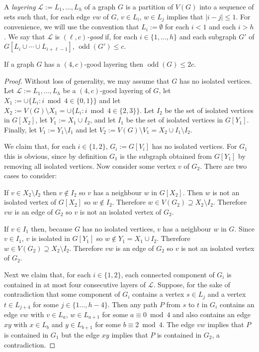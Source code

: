 \documentclass{patmorin}
\DeclareMathOperator{\odd}{odd}
\begin{document}
A \emph{layering} $\mathcal{L}:=L_1,\ldots,L_h$ of a graph $G$ is a partition of $V(G)$ into a sequence of sets such that, for each edge $vw$ of $G$, $v\in L_i$, $w\in L_j$ implies that $|i-j|\le 1$.  For convenience, we will use the convention that $L_i:=\emptyset$ for each $i < 1$ and each $i> h$.  We say that $\mathcal{L}$ is \emph{$(\ell,c)$-good} if, for each $i\in\{1,\ldots,h\}$ and each subgraph $G'$ of $G[L_i\cup\cdots\cup L_{i+\ell-1}]$, $\odd(G')\le c$.


\begin{lem}\label{four_good}
  If a graph $G$ has a $(4,c)$-good layering then $\odd(G)\le 2c$.
\end{lem}

\begin{proof}
  Without loss of generality, we may assume that $G$ has no isolated vertices.
  Let $\mathcal{L}:=L_1,\ldots,L_h$ be a $(4,c)$-good layering of $G$,
  let $X_1:=\cup\{L_i:i\bmod 4\in\{0,1\}\}$ and let $X_2:=V(G)\setminus X_1=\cup\{L_i:i\bmod 4\in\{2,3\}\}$.  Let $I_2$ be the set of isolated vertices in $G[X_2]$, let $Y_1:=X_1\cup I_2$, and let $I_1$ be the set of isolated vertices in $G[Y_1]$.  Finally, let $V_1:=Y_1\setminus I_1$ and let $V_2:=V(G)\setminus V_1=X_2\cup I_1\setminus I_2$.

  We claim that, for each $i\in\{1,2\}$, $G_i:=G[V_i]$ has no isolated vertices. For $G_1$ this is obvious, since by definition $G_1$ is the subgraph obtained from $G[Y_1]$ by removing all isolated vertices.  Now consider some vertex $v$ of $G_2$. There are two cases to consider:
  \begin{compactenum}
    \item If $v\in X_2\setminus I_2$ then $v\not\in I_2$ so $v$ has a neighbour $w$ in $G[X_2]$.  Then $w$ is not an isolated vertex of $G[X_2]$ so $w\not\in I_2$.  Therefore $w\in V(G_2)\supseteq X_2\setminus I_2$. Therefore $vw$ is an edge of $G_2$ so $v$ is not an isolated vertex of $G_2$.
    \item If $v\in I_1$ then, because $G$ has no isolated vertices, $v$ has a neighbour $w$ in $G$.  Since $v\in I_1$, $v$ is isolated in $G[Y_1]$ so $w\not\in Y_1= X_1\cup I_2$. Therefore $w\in V(G_2)\supseteq X_2\setminus I_2$.  Therefore $vw$ is an edge of $G_2$ so $v$ is not an isolated vertex of $G_2$.
  \end{compactenum}
  Next we claim that, for each $i\in\{1,2\}$, each connected component of $G_i$ is contained in at most four consecutive layers of $\mathcal{L}$.  Suppose, for the sake of contradiction that some component of $G_i$ contains a vertex $s\in L_j$ and a vertex $t\in L_{j+4}$ for some $j\in\{1\ldots,h-4\}$.  Then any path $P$ from $s$ to $t$ in $G_i$ contains an edge $vw$ with $v\in L_a$, $w\in L_{a+1}$ for some $a\equiv 0\bmod 4$ and also contains an edge $xy$ with $x\in L_b$ and $y\in L_{b+1}$ for some $b\equiv 2\bmod 4$.  The edge $vw$ implies that $P$ is contained in $G_1$ but the edge $xy$ implies that $P$ is contained in $G_2$, a contradiction.


\end{proof}
\end{document}

